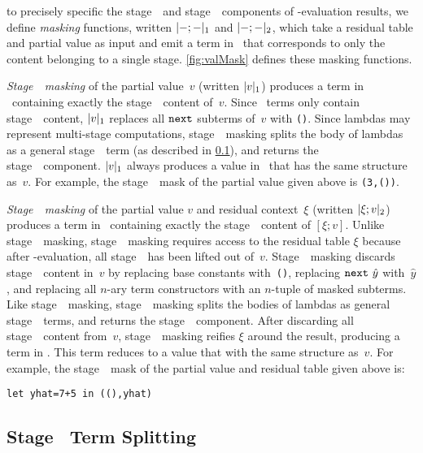 to precisely specific the stage~\bbone\ and stage~\bbtwo\ components of \bbone-evaluation results, we define 
\emph{masking} functions, written $|{-};{-}|_{ 1}$ and $|{-};{-}|_{ 2}$, 
which take a residual table and partial value as input and emit a term in \langmono\
that corresponds to only the content belonging to a single stage.
\ref{fig:valMask} defines these masking functions.

\emph{Stage~\bbone\ masking} of the partial value~$v$ (written $|v|_{ 1}$) produces a term in \langmono\ containing exactly
the stage~\bbone\ content of~$v$. Since \next\ terms only contain stage~\bbtwo\
content, $|v|_{ 1}$ replaces all ${\tt next}$ subterms of~$v$ with \texttt{()}.  Since lambdas may represent multi-stage computations, stage~\bbone\ masking splits the body of lambdas as a general stage~\bbone\ term (as described in \ref{sec:split-one}), and returns
the stage~\bbone\ component. $|v|_{ 1}$ always produces a value in \langmono\ that has
the same structure as~$v$.  For example, the stage~\bbone\ mask of the partial value given above is \texttt{(3,())}. 

\emph{Stage~\bbtwo\ masking} of the partial value $v$ and residual context~$\xi$ (written $|\xi;v|_{ 2}$) produces a term in \langmono\ containing
exactly the stage~\bbtwo\ content of $[\xi;v]$. Unlike stage~\bbone\ masking, stage~\bbtwo\ masking 
requires access to the residual table $\xi$ because after \bbone-evaluation, all stage~\bbtwo\
has been lifted out of~$v$. Stage~\bbtwo\ masking discards
stage~\bbone\ content in~$v$ by replacing base constants with~\texttt{()},
replacing ${\tt next}~\hat{y}$ with~$\hat{y}$, and replacing all $n$-ary term
constructors with an $n$-tuple of masked subterms. Like stage~\bbone\ masking, stage~\bbtwo\
masking splits the bodies of lambdas as general stage~\bbone\ terms, and
returns the stage~\bbtwo\ component. After discarding all stage~\bbone\ content from~$v$, stage~\bbtwo\ masking reifies $\xi$ around the result,
producing a term in \langmono. This term reduces to a value that with the same structure as~$v$.
For example, the stage~\bbtwo\ mask of the partial value and residual table given above is:
\begin{lstlisting}
let yhat=7+5 in ((),yhat)
\end{lstlisting}

\subsection{Stage \bbone\ Term Splitting}
\label{sec:split-one}

